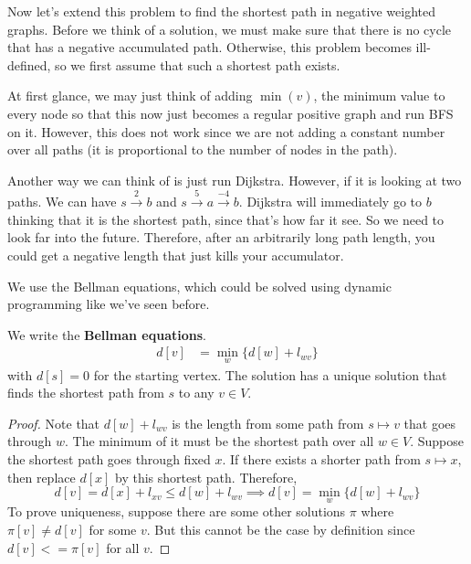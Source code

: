 \documentclass{article}
\begin{document}
    Now let's extend this problem to find the shortest path in negative weighted graphs. Before we think of a solution, we must make sure that there is no cycle that has a negative accumulated path. Otherwise, this problem becomes ill-defined, so we first assume that such a shortest path exists. 

    At first glance, we may just think of adding $\min(v)$, the minimum value to every node so that this now just becomes a regular positive graph and run BFS on it. However, this does not work since we are not adding a constant number over all paths (it is proportional to the number of nodes in the path). 

    Another way we can think of is just run Dijkstra. However, if it is looking at two paths. We can have $s \xrightarrow{2} b$ and $s \xrightarrow{5} a \xrightarrow{-4} b$. Dijkstra will immediately go to $b$ thinking that it is the shortest path, since that's how far it see. So we need to look far into the future. Therefore, after an arbitrarily long path length, you could get a negative length that just kills your accumulator.  

    We use the Bellman equations, which could be solved using dynamic programming like we've seen before. 

    \begin{theorem}
      We write the \textbf{Bellman equations}. 
      \begin{align}
        d[v] & = \min_{w} \{ d[w] + l_{w v}\}
      \end{align}
      with $d[s] = 0$ for the starting vertex. The solution has a unique solution that finds the shortest path from $s$ to any $v \in V$.    
    \end{theorem}
    \begin{proof}
      Note that $d[w] + l_{wv}$ is the length from some path from $s \mapsto v$ that goes through $w$. The minimum of it must be the shortest path over all $w \in V$. Suppose the shortest path goes through fixed $x$. If there exists a shorter path from $s \mapsto x$, then replace $d[x]$ by this shortest path. Therefore, 
      \begin{equation}
        d[v] = d[x] + l_{xv} \leq d[w] + l_{wv} \implies d[v] = \min_{w} \{d[w] + l_{w v}\}
      \end{equation}
      To prove uniqueness, suppose there are some other solutions $\pi$ where $\pi[v] \neq d[v]$ for some $v$. But this cannot be the case by definition since $d[v] <= \pi[v]$ for all $v$. 
    \end{proof}
\end{document}
